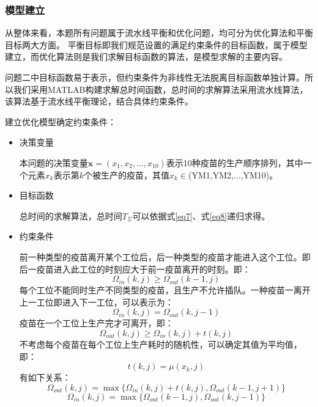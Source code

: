 \documentclass[UTF8]{ctexart}
\begin{document}
	\subsubsection{模型建立}
	从整体来看，本题所有问题属于流水线平衡和优化问题，均可分为优化算法和平衡目标两大方面。%
	平衡目标即我们规范设置的满足约束条件的目标函数，属于模型建立，而优化算法则是我们求解目标函数的算法，是模型求解的主要内容。
		
	问题二中目标函数易于表示，但约束条件为非线性无法脱离目标函数单独计算。所以我们采用MATLAB构建求解总时间函数，总时间的求解算法采用流水线算法，该算法基于流水线平衡理论，结合具体约束条件。
	
	建立优化模型确定约束条件：
	\begin{itemize}
		\item 决策变量 
		\par 本问题的决策变量$\boldsymbol{x}=(x_{1},x_{2},\dots,x_{10})$表示10种疫苗的生产顺序排列，其中一个元素$x_{k}$表示第$k$个被生产的疫苗，其值$x_{k}\in$(YM1,YM2,$\dots$,YM10)。
		\item 目标函数
		\par 总时间的求解算法，总时间$T_{\Sigma}$可以依据式\ref{eq7}、式\ref{eq8}递归求得。
		\item 约束条件
		\par 前一种类型的疫苗离开某个工位后，后一种类型的疫苗才能进入这个工位。即后一疫苗进入此工位的时刻应大于前一疫苗离开的时刻。即：
	\begin{equation}
		\Omega_{in}(k,j)\geqslant\Omega_{out}(k-1,j)
	\end{equation}
		每个工位不能同时生产不同类型的疫苗，且生产不允许插队。一种疫苗一离开上一工位即进入下一工位，可以表示为：
	\begin{equation}
		\Omega_{in}(k,j)=\Omega_{out}(k,j-1)
	\end{equation}
	疫苗在一个工位上生产完才可离开，即：
	\begin{equation}
		\Omega_{out}(k,j)\geqslant\Omega_{in}(k,j)+t(k,j)
	\end{equation}
	不考虑每个疫苗在每个工位上生产耗时的随机性，可以确定其值为平均值，即：
	\begin{equation}
		t(k,j)=\mu(x_{k},j)
	\end{equation}
	有如下关系：
	\begin{equation}
		\Omega_{out}(k,j)=\max\{\Omega_{in}(k,j)+t(k,j),\Omega_{out}(k-1,j+1)\}
		\label{eq7}
	\end{equation}
	\begin{equation}
		\Omega_{in}(k,j)=\max\{\Omega_{out}(k-1,j),\Omega_{out}(k,j-1)\}
		\label{eq8}
	\end{equation}
		



\end{itemize}
\end{document}
